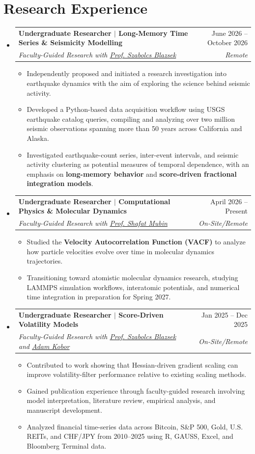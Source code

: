 \documentclass[letterpaper,11.000000001 pt]{article}
\makeatletter
\newcommand{\resumeItem}[1]{
  \item\small{
    {#1 \vspace{-1pt}}
  }
}
\newcommand{\resumeSubheading}[4]{
  \vspace{-1pt}\item
    \begin{tabular*}{0.97\textwidth}[t]{l@{\extracolsep{\fill}}r}
      \textbf{#1} & #2 \\
      \textit{\small#3} & \textit{\small #4} \\
    \end{tabular*}\vspace{-6pt}
}
\newcommand{\resumeSubHeadingListStart}{\begin{itemize}[leftmargin=0.15in, label={}]}
\newcommand{\resumeSubHeadingListEnd}{\end{itemize}}
\newcommand{\resumeItemListStart}{\begin{itemize}}
\newcommand{\resumeItemListEnd}{\end{itemize}\vspace{-5pt}}
\makeatother
\begin{document}
\section{Research Experience}
  \resumeSubHeadingListStart  
    \resumeSubheading
      {Undergraduate Researcher $|$ Long-Memory Time Series \& Seismicity Modelling}{June 2026 – October 2026}
      {Faculty-Guided Research with  \href{https://business.mercer.edu/faculty-and-insights/faculty-directory/dr-szabolcs-blazsek/}{Prof. Szabolcs Blazsek}}{Remote}
      \resumeItemListStart
        \resumeItem{Independently proposed and initiated a research investigation into earthquake dynamics with the aim of exploring the science behind seismic activity.}
        \resumeItem{Developed a Python-based data acquisition workflow using USGS earthquake catalog queries, compiling and analyzing over two million seismic observations spanning more than 50 years across California and Alaska.}
        \resumeItem{Investigated earthquake-count series, inter-event intervals, and seismic activity clustering as potential measures of temporal dependence, with an emphasis on \textbf{long-memory behavior} and \textbf{score-driven fractional integration models}.}
        \resumeItemListEnd
  \resumeSubHeadingListEnd

\resumeSubHeadingListStart  
    \resumeSubheading
      {Undergraduate Researcher $|$ Computational Physics \& Molecular Dynamics}{April 2026 – Present}
      {Faculty-Guided Research with \href{https://www.valdosta.edu/about/directory/profile/smubin}{Prof. Shafat Mubin}}{On-Site/Remote}
      \resumeItemListStart
      \resumeItem{Studied the \textbf{Velocity Autocorrelation Function (VACF)} to analyze how particle velocities evolve over time in molecular dynamics trajectories.}
      \resumeItem{Transitioning toward atomistic molecular dynamics research, studying LAMMPS simulation workflows, interatomic potentials, and numerical time integration in preparation for Spring 2027.}
      \resumeItemListEnd
  \resumeSubHeadingListEnd

  \resumeSubHeadingListStart
    \resumeSubheading
      {Undergraduate Researcher $|$ Score-Driven Volatility Models}{Jan 2025 – Dec 2025}
      {Faculty-Guided Research with \href{https://business.mercer.edu/faculty-and-insights/faculty-directory/dr-szabolcs-blazsek/}{Prof. Szabolcs Blazsek} and \href{https://www.linkedin.com/in/adamkobor/}{Adam Kobor}}{On-Site/Remote}
      \resumeItemListStart
      \resumeItem{Contributed to work showing that Hessian-driven gradient scaling can improve volatility-filter performance relative to existing scaling methods.}
      \resumeItem{Gained publication experience through faculty-guided research involving model interpretation, literature review, empirical analysis, and manuscript development.}
        \resumeItem{Analyzed financial time-series data across Bitcoin, S\&P 500, Gold, U.S. REITs, and CHF/JPY from 2010--2025 using R, GAUSS, Excel, and Bloomberg Terminal data.}
      \resumeItemListEnd
  \resumeSubHeadingListEnd
\end{document}
